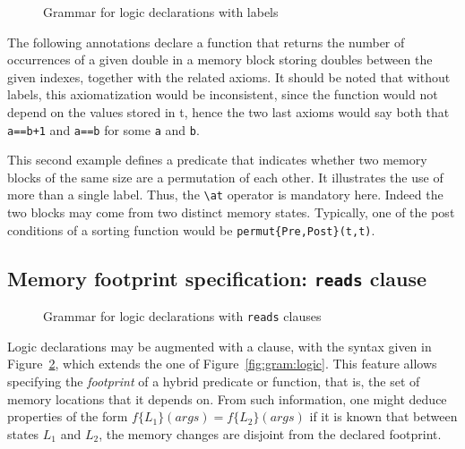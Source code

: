 \begin{figure}[t]
  \begin{cadre}
      
    \end{cadre}
  \caption{Grammar for logic declarations with labels}
\label{fig:gram:logiclabels}
\end{figure}

\begin{example}\label{ex:nb_occ}
  The following annotations declare a function that returns the
  number of occurrences of a given double in a memory block storing doubles
  between the given indexes, together with the related axioms.  It
  should be noted that without labels, this axiomatization would be
  inconsistent, since the function would not depend on the values
  stored in t, hence the two last axioms would say both that \lstinline|a==b+1|
  and \lstinline|a==b| for some \lstinline|a| and \lstinline|b|.
\end{example}

\begin{example}
  This second example defines a predicate that indicates whether two
  memory blocks of the same size are a permutation of each other. It
  illustrates the use of more than a single label. Thus, the \lstinline|\at|
  operator is mandatory here. Indeed the two blocks
  may come from two distinct memory states. Typically, one of the post
  conditions of a sorting function would be \lstinline|permut{Pre,Post}(t,t)|.
\end{example}


\subsection{Memory footprint specification: \texorpdfstring{\lstinline|reads|}{reads} clause}

\begin{figure}[t]
  \begin{cadre}
      
    \end{cadre}
  \caption{Grammar for logic declarations with \lstinline|reads| clauses}
\label{fig:gram:logicreads}
\end{figure}


\experimental

Logic declarations may be augmented with a \reads{} clause, with the
syntax given in Figure~\ref{fig:gram:logicreads}, which extends the
one of Figure~\ref{fig:gram:logic}. This feature allows specifying the
\emph{footprint} of a hybrid predicate or function, that is, the set of
memory locations that it depends on. From such information, one
might deduce properties of the form $f\{L_1\}(args) = f\{L_2\}(args)$
if it is known that between states $L_1$ and $L_2$, the memory changes are
disjoint from the declared footprint.


